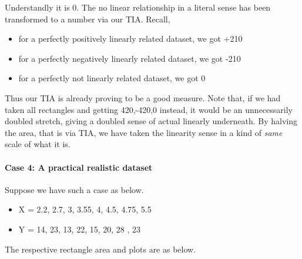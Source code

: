\documentclass[float=false,crop=false]{standalone}
\begin{document}
    Understandly it is 0. The no linear relationship in a literal sense has
been transformed to a number via our TIA. Recall,

\begin{itemize}
\tightlist
\item
  for a perfectly positively linearly related dataset, we got +210
\item
  for a perfectly negatively linearly related dataset, we got -210
\item
  for a perfectly not linearly related dataset, we got 0
\end{itemize}

Thus our TIA is already proving to be a good measure. Note that, if we
had taken all rectangles and getting 420,-420,0 instead, it would be an
unnecessarily doubled stretch, giving a doubled sense of actual linearly
underneath. By halving the area, that is via TIA, we have taken the
linearity sense in a kind of \emph{same} scale of what it is.

    \paragraph{Case 4: A practical realistic
dataset}\label{case-4-a-practical-realistic-dataset}

Suppose we have such a case as below.

\begin{itemize}
\tightlist
\item
  X = 2.2, 2.7, 3, 3.55, 4, 4.5, 4.75, 5.5
\item
  Y = 14, 23, 13, 22, 15, 20, 28 , 23
\end{itemize}

The respective rectangle area and plots are as below.
    \begin{center}
    \end{center}
    { \hspace*{\fill} \\}
    
\end{document}
